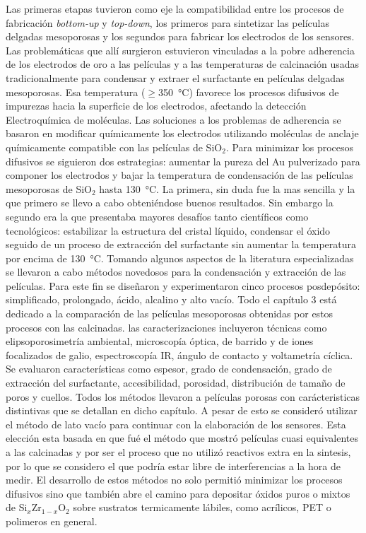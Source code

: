 Las primeras etapas tuvieron como eje la compatibilidad entre los procesos de fabricación \textit{bottom-up} y \textit{top-down}, los primeros para sintetizar las películas delgadas mesoporosas y los segundos para fabricar los electrodos de los sensores. Las problemáticas que allí surgieron estuvieron vinculadas a la pobre adherencia de los electrodos de oro a las películas y a las temperaturas de calcinación usadas tradicionalmente para condensar y extraer el surfactante en películas delgadas mesoporosas. Esa temperatura ($\geq$\SI{350}{\celsius}) favorece los procesos difusivos de impurezas hacia la superficie de los electrodos, afectando la detección Electroquímica de moléculas. Las soluciones a los problemas de adherencia se basaron en modificar químicamente los electrodos utilizando moléculas de anclaje químicamente compatible con las películas de SiO$_2$. Para minimizar los procesos difusivos se siguieron dos estrategias: aumentar la pureza del Au pulverizado para componer los electrodos y bajar la temperatura de condensación de las películas mesoporosas de SiO$_2$ hasta \SI{130}{\celsius}. La primera, sin duda fue la mas sencilla y la que primero se llevo a cabo obteniéndose buenos resultados. Sin embargo la segundo era la que presentaba mayores desafíos tanto científicos como tecnológicos: estabilizar la estructura del cristal líquido, condensar el óxido seguido de un proceso de extracción del surfactante sin aumentar la temperatura por encima de \SI{130}{\celsius}. Tomando algunos aspectos de la literatura especializadas se llevaron a cabo métodos novedosos para la condensación y extracción de las películas. Para este fin se diseñaron y experimentaron cinco procesos posdepósito: simplificado, prolongado, ácido, alcalino y alto vacío. Todo el capítulo 3 está dedicado a la comparación de las películas mesoporosas obtenidas por estos procesos con las calcinadas. las caracterizaciones incluyeron técnicas como elipsoporosimetría ambiental, microscopía óptica, de barrido y de iones focalizados de galio, espectroscopía IR, ángulo de contacto y voltametría cíclica. Se evaluaron características como espesor, grado de condensación, grado de extracción del surfactante, accesibilidad, porosidad, distribución de tamaño de poros y cuellos. Todos los métodos llevaron a películas porosas con carácteristicas distintivas que se detallan en dicho capítulo. A pesar de esto se consideró utilizar el método de lato vacío para continuar con la elaboración de los sensores. Esta elección esta basada en que fué el método que mostró películas cuasi equivalentes a las calcinadas y por ser el proceso que no utilizó reactivos extra en la sintesis, por lo que se considero el que podría estar libre de interferencias a la hora de medir. El desarrollo de estos métodos no solo permitió minimizar los procesos difusivos sino que también abre el camino para depositar óxidos puros o mixtos de Si$_x$Zr$_{1-x}$O$_2$ sobre sustratos termicamente lábiles, como acrílicos, PET o polimeros en general.

